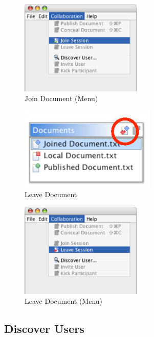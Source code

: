 \documentclass[11pt,a4paper]{article}
\begin{document}
\begin{figure}[H]
\begin{center}
  \includegraphics[height=1.78in, width=2.28in]{../images/usermanual/menu_collab_join.eps}
\caption{Join Document (Menu)}
\label{default}
\end{center}
\end{figure}

\begin{figure}[H]
\begin{center}
  \includegraphics[height=1.56in, width=2.56in]{../images/usermanual/g_dview_leave.eps}
\caption{Leave Document}
\label{default}
\end{center}
\end{figure}

\begin{figure}[H]
\begin{center}
  \includegraphics[height=1.78in, width=2.28in]{../images/usermanual/menu_collab_leave.eps}
\caption{Leave Document (Menu)}
\label{default}
\end{center}
\end{figure}


\subsection{Discover Users}
\end{document}
